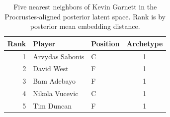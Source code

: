 \begin{table}[htbp]
  \centering\small
  \begin{tabular}{rllc}
    \toprule
    Rank & Player & Position & Archetype \\
    \midrule
    1 & Arvydas Sabonis & C & 1 \\
    2 & David West & F & 1 \\
    3 & Bam Adebayo & F & 1 \\
    4 & Nikola Vucevic & C & 1 \\
    5 & Tim Duncan & F & 1 \\
    \bottomrule
  \end{tabular}
  \caption{Five nearest neighbors of Kevin Garnett in the Procrustes-aligned posterior latent space. Rank is by posterior mean embedding distance.}
  \label{tab:Kevin_Garnett_neighbors}
\end{table}

